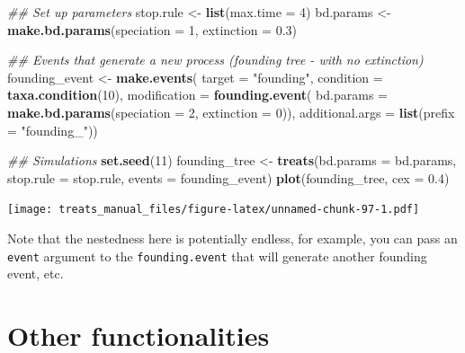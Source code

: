 \documentclass[
]{book}
\newenvironment{Shaded}{\begin{snugshade}}{\end{snugshade}}
\newcommand{\CommentTok}[1]{\textcolor[rgb]{0.56,0.35,0.01}{\textit{#1}}}
\newcommand{\DataTypeTok}[1]{\textcolor[rgb]{0.13,0.29,0.53}{#1}}
\newcommand{\DecValTok}[1]{\textcolor[rgb]{0.00,0.00,0.81}{#1}}
\newcommand{\FloatTok}[1]{\textcolor[rgb]{0.00,0.00,0.81}{#1}}
\newcommand{\KeywordTok}[1]{\textcolor[rgb]{0.13,0.29,0.53}{\textbf{#1}}}
\newcommand{\NormalTok}[1]{#1}
\newcommand{\StringTok}[1]{\textcolor[rgb]{0.31,0.60,0.02}{#1}}
\begin{document}
\begin{Shaded}
\begin{Highlighting}[]
\CommentTok{\#\# Set up parameters}
\NormalTok{stop.rule \textless{}{-}}\StringTok{ }\KeywordTok{list}\NormalTok{(}\DataTypeTok{max.time =} \DecValTok{4}\NormalTok{)}
\NormalTok{bd.params \textless{}{-}}\StringTok{ }\KeywordTok{make.bd.params}\NormalTok{(}\DataTypeTok{speciation =} \DecValTok{1}\NormalTok{, }\DataTypeTok{extinction =} \FloatTok{0.3}\NormalTok{)}

\CommentTok{\#\# Events that generate a new process (founding tree {-} with no extinction)}
\NormalTok{founding\_event \textless{}{-}}\StringTok{ }\KeywordTok{make.events}\NormalTok{(}
                  \DataTypeTok{target       =} \StringTok{"founding"}\NormalTok{,}
                  \DataTypeTok{condition    =} \KeywordTok{taxa.condition}\NormalTok{(}\DecValTok{10}\NormalTok{),}
                  \DataTypeTok{modification =} \KeywordTok{founding.event}\NormalTok{(}
                                    \DataTypeTok{bd.params =} \KeywordTok{make.bd.params}\NormalTok{(}\DataTypeTok{speciation =} \DecValTok{2}\NormalTok{,}
                                                               \DataTypeTok{extinction =} \DecValTok{0}\NormalTok{)),}
                  \DataTypeTok{additional.args =} \KeywordTok{list}\NormalTok{(}\DataTypeTok{prefix =} \StringTok{"founding\_"}\NormalTok{))}
    
\CommentTok{\#\# Simulations}
\KeywordTok{set.seed}\NormalTok{(}\DecValTok{11}\NormalTok{)}
\NormalTok{founding\_tree \textless{}{-}}\StringTok{ }\KeywordTok{treats}\NormalTok{(}\DataTypeTok{bd.params =}\NormalTok{ bd.params,}
                        \DataTypeTok{stop.rule =}\NormalTok{ stop.rule,}
                        \DataTypeTok{events    =}\NormalTok{ founding\_event)}
\KeywordTok{plot}\NormalTok{(founding\_tree, }\DataTypeTok{cex =} \FloatTok{0.4}\NormalTok{)}
\end{Highlighting}
\end{Shaded}

\texttt{[image: treats\_manual\_files/figure-latex/unnamed-chunk-97-1.pdf]}

Note that the nestedness here is potentially endless, for example, you can pass an \texttt{event} argument to the \texttt{founding.event} that will generate another founding event, etc.

\hypertarget{others}{%
\chapter{Other functionalities}\label{others}}
\end{document}
